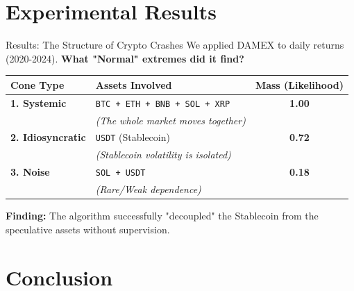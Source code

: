 \documentclass{beamer}
\begin{document}
\section{Experimental Results}
\begin{frame}{Results: The Structure of Crypto Crashes}
    We applied DAMEX to daily returns (2020-2024). 
    \textbf{What "Normal" extremes did it find?}

    \begin{table}[]
        \centering
        \footnotesize
        \begin{tabular}{llc}
            \toprule
            \textbf{Cone Type} & \textbf{Assets Involved} & \textbf{Mass (Likelihood)} \\
            \midrule
            \textbf{1. Systemic} & \texttt{BTC + ETH + BNB + SOL + XRP} & \textbf{1.00} \\
            & \textit{(The whole market moves together)} & \\
            \midrule
            \textbf{2. Idiosyncratic} & \texttt{USDT} (Stablecoin) & \textbf{0.72} \\
            & \textit{(Stablecoin volatility is isolated)} & \\
            \midrule
            \textbf{3. Noise} & \texttt{SOL + USDT} & \textbf{0.18} \\
            & \textit{(Rare/Weak dependence)} & \\
            \bottomrule
        \end{tabular}
    \end{table}

    \textbf{Finding:} The algorithm successfully "decoupled" the Stablecoin from the speculative assets without supervision.
\end{frame}

\section{Conclusion}
\end{document}
